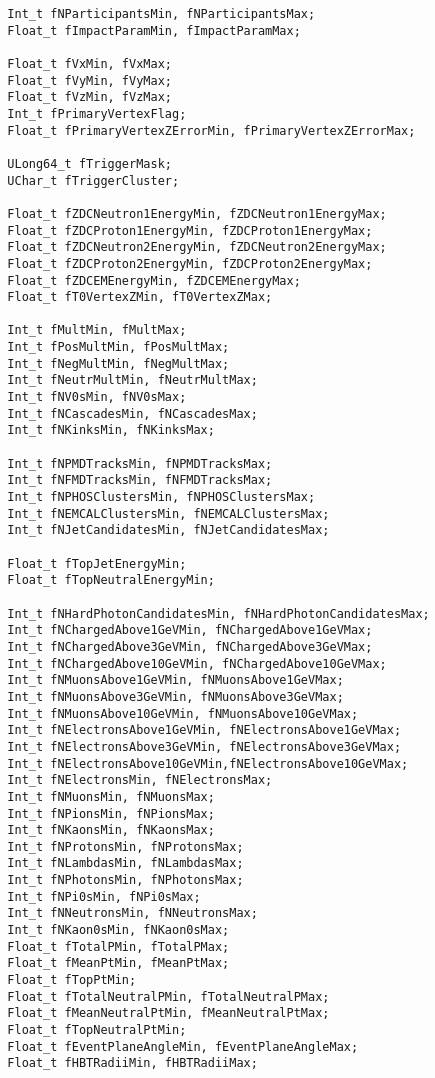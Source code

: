 \par
{\ttfamily \noindent
\begin{verbatim}
  Int_t fNParticipantsMin, fNParticipantsMax;
  Float_t fImpactParamMin, fImpactParamMax;

  Float_t fVxMin, fVxMax;
  Float_t fVyMin, fVyMax;
  Float_t fVzMin, fVzMax;
  Int_t fPrimaryVertexFlag;
  Float_t fPrimaryVertexZErrorMin, fPrimaryVertexZErrorMax;

  ULong64_t fTriggerMask;
  UChar_t fTriggerCluster;
  
  Float_t fZDCNeutron1EnergyMin, fZDCNeutron1EnergyMax;
  Float_t fZDCProton1EnergyMin, fZDCProton1EnergyMax;
  Float_t fZDCNeutron2EnergyMin, fZDCNeutron2EnergyMax;
  Float_t fZDCProton2EnergyMin, fZDCProton2EnergyMax;
  Float_t fZDCEMEnergyMin, fZDCEMEnergyMax;
  Float_t fT0VertexZMin, fT0VertexZMax;

  Int_t fMultMin, fMultMax;
  Int_t fPosMultMin, fPosMultMax;
  Int_t fNegMultMin, fNegMultMax;
  Int_t fNeutrMultMin, fNeutrMultMax;
  Int_t fNV0sMin, fNV0sMax;
  Int_t fNCascadesMin, fNCascadesMax;
  Int_t fNKinksMin, fNKinksMax;
  
  Int_t fNPMDTracksMin, fNPMDTracksMax;
  Int_t fNFMDTracksMin, fNFMDTracksMax;
  Int_t fNPHOSClustersMin, fNPHOSClustersMax;
  Int_t fNEMCALClustersMin, fNEMCALClustersMax;
  Int_t fNJetCandidatesMin, fNJetCandidatesMax;

  Float_t fTopJetEnergyMin;
  Float_t fTopNeutralEnergyMin;
  
  Int_t fNHardPhotonCandidatesMin, fNHardPhotonCandidatesMax;
  Int_t fNChargedAbove1GeVMin, fNChargedAbove1GeVMax;
  Int_t fNChargedAbove3GeVMin, fNChargedAbove3GeVMax;
  Int_t fNChargedAbove10GeVMin, fNChargedAbove10GeVMax;
  Int_t fNMuonsAbove1GeVMin, fNMuonsAbove1GeVMax;
  Int_t fNMuonsAbove3GeVMin, fNMuonsAbove3GeVMax;
  Int_t fNMuonsAbove10GeVMin, fNMuonsAbove10GeVMax;
  Int_t fNElectronsAbove1GeVMin, fNElectronsAbove1GeVMax;
  Int_t fNElectronsAbove3GeVMin, fNElectronsAbove3GeVMax;
  Int_t fNElectronsAbove10GeVMin,fNElectronsAbove10GeVMax;
  Int_t fNElectronsMin, fNElectronsMax;
  Int_t fNMuonsMin, fNMuonsMax;
  Int_t fNPionsMin, fNPionsMax;
  Int_t fNKaonsMin, fNKaonsMax;
  Int_t fNProtonsMin, fNProtonsMax;
  Int_t fNLambdasMin, fNLambdasMax;
  Int_t fNPhotonsMin, fNPhotonsMax;
  Int_t fNPi0sMin, fNPi0sMax;
  Int_t fNNeutronsMin, fNNeutronsMax;
  Int_t fNKaon0sMin, fNKaon0sMax;
  Float_t fTotalPMin, fTotalPMax;
  Float_t fMeanPtMin, fMeanPtMax;
  Float_t fTopPtMin;
  Float_t fTotalNeutralPMin, fTotalNeutralPMax;
  Float_t fMeanNeutralPtMin, fMeanNeutralPtMax;
  Float_t fTopNeutralPtMin;
  Float_t fEventPlaneAngleMin, fEventPlaneAngleMax;
  Float_t fHBTRadiiMin, fHBTRadiiMax;
\end{verbatim}
}